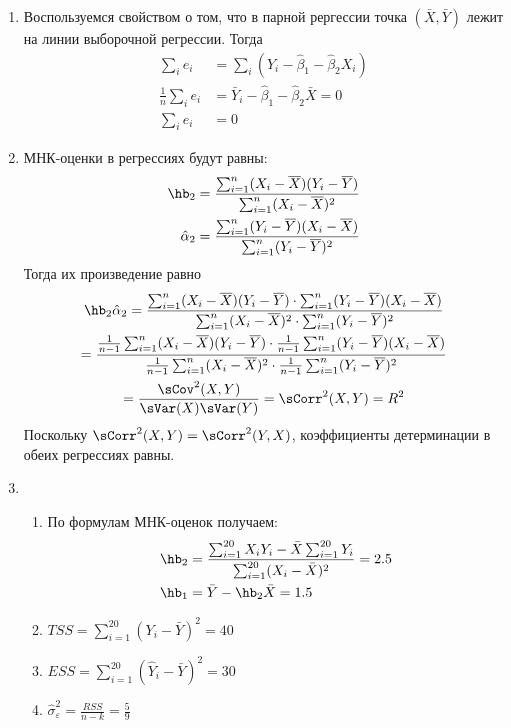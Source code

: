 \begin{enumerate}
\item Воспользуемся свойством о том, что в парной рергессии точка $(\bar X, \bar Y)$
лежит на линии выборочной регрессии. Тогда
\begin{align*}
\sum_i e_i &= \sum_i (Y_i - \hat \beta_1 - \hat \beta_2 X_i) \\
\frac{1}{n} \sum_i e_i &= \bar Y_i -  \hat \beta_1 - \hat \beta_2 \bar X = 0 \\
\sum_i e_i &= 0
\end{align*}

\item МНК-оценки в регрессиях будут равны:
\begin{align*}
\hb_2 = \frac{\sum_{i=1}^n (X_i - \overline X)(Y_i - \overline Y)}{\sum_{i=1}^n (X_i - \overline X)^2} \\
\hat\alpha_2 = \frac{\sum_{i=1}^n (Y_i - \overline Y)(X_i - \overline X)}{\sum_{i=1}^n (Y_i - \overline Y)^2}
\end{align*}
Тогда их произведение равно
\begin{multline*}
\hb_2 \hat\alpha_2 = \frac{\sum_{i=1}^n (X_i - \overline X)(Y_i - \overline Y) \cdot \sum_{i=1}^n (Y_i - \overline Y)(X_i - \overline X)}{\sum_{i=1}^n (X_i - \overline X)^2 \cdot \sum_{i=1}^n (Y_i - \overline Y)^2} \\
= \frac{\frac{1}{n-1} \sum_{i=1}^n (X_i - \overline X)(Y_i - \overline Y) \cdot \frac{1}{n-1}  \sum_{i=1}^n (Y_i - \overline Y)(X_i - \overline X)}{\frac{1}{n-1} \sum_{i=1}^n (X_i - \overline X)^2 \cdot \frac{1}{n-1} \sum_{i=1}^n (Y_i - \overline Y)^2} \\
= \frac{\sCov^2(X,Y)}{\sVar(X)\sVar(Y)} = \sCorr^2(X,Y) = R^2
\end{multline*}
Поскольку $\sCorr^2(X,Y) = \sCorr^2(Y,X)$, коэффициенты детерминации в обеих регрессиях равны.

\item
\begin{enumerate}
\item По формулам МНК-оценок получаем:
\begin{align*}
&\hb_2 = \frac{\sum_{i=1}^{20} X_i Y_i - \bar X \sum_{i=1}^{20} Y_i}{\sum_{i=1}^{20} (X_i - \bar X)^2} = 2.5 \\
&\hb_1 = \bar Y - \hb_2 \bar X = 1.5
\end{align*}
\item $TSS = \sum_{i=1}^{20} (Y_i - \bar Y)^2 = 40$
\item $ESS = \sum_{i=1}^{20} (\hat Y_i - \bar Y)^2 = 30$
\item $\hat\sigma^2_{\varepsilon} = \frac{RSS}{n-k} = \frac{5}{9}$
\end{enumerate}


\end{enumerate}
